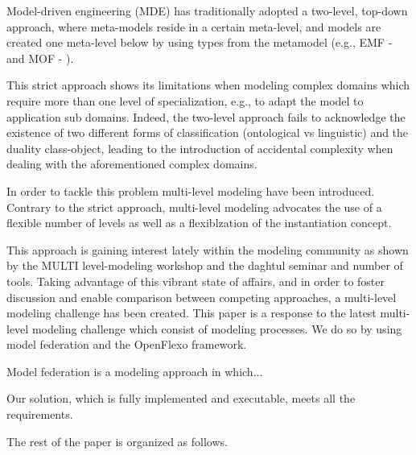 Model-driven engineering (MDE) has traditionally adopted a two-level, top-down approach, where meta-models reside in a certain meta-level, and models are created one meta-level below by using types from the metamodel (e.g., EMF - \cite{emf} and MOF - \cite{omg2013mof}).

This strict approach shows its limitations when modeling complex domains which require more than one level of specialization, e.g., to adapt the model to application sub domains. Indeed, the two-level approach fails to acknowledge the existence of two different forms of classification (ontological vs linguistic) and the duality class-object, leading to the introduction of accidental complexity when dealing with the aforementioned complex domains.

In order to tackle this problem multi-level modeling have been introduced. Contrary to the strict approach, multi-level modeling advocates the use of a flexible number of levels as well as a flexiblzation of the instantiation concept.

This approach is gaining interest lately within the modeling community as shown by the MULTI level-modeling workshop and the daghtul seminar and number of tools. Taking advantage of this vibrant state of affairs, and in order to foster discussion and enable comparison between competing approaches, a multi-level modeling challenge has been created. This paper is a response to the latest multi-level modeling challenge which consist of modeling processes. We do so by using model federation and the OpenFlexo framework.

Model federation is a modeling approach in which...

Our solution, which is fully implemented and executable, meets all the requirements.

The rest of the paper is organized as follows.





